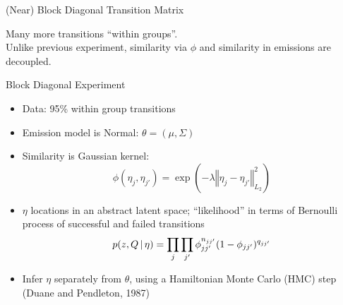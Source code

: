 \documentclass[11pt, mathserif, handout, table]{beamer}
\begin{document}
\begin{frame}{(Near) Block Diagonal Transition Matrix}
\begin{minipage}{0.45\textwidth}
\begin{center}
\end{center}
\end{minipage}
Many more transitions ``within groups''.\\
Unlike previous experiment, similarity via $\phi$ and similarity in
emissions are decoupled.
\end{frame}
\begin{frame}{Block Diagonal Experiment}
  \begin{itemize}[<+->]
  \item Data: 95\% within group transitions
  \item Emission model is Normal: $\theta = (\mu, \Sigma)$
  \item Similarity is Gaussian kernel:
    \begin{equation*}
      \phi(\eta_j, \eta_{j'}) = \exp(-\lambda \left \Vert \eta_{j} -
          \eta_{j'} \right \Vert_{L_2}^2)
    \end{equation*}
  \item $\eta$ locations in an abstract latent space; ``likelihood''
    in terms of Bernoulli process of successful and failed transitions
    \begin{equation*}
      p(z, Q \, \vert \, \eta) = \prod_{j}\prod_{j'} \phi_{jj'}^{n_{jj'}}
      (1 - \phi_{jj'})^{q_{jj'}}
    \end{equation*}
  \item Infer $\eta$ separately from $\theta$, using a Hamiltonian
    Monte Carlo (HMC) step (Duane and Pendleton, 1987)
  \end{itemize}
\end{frame}
\end{document}
